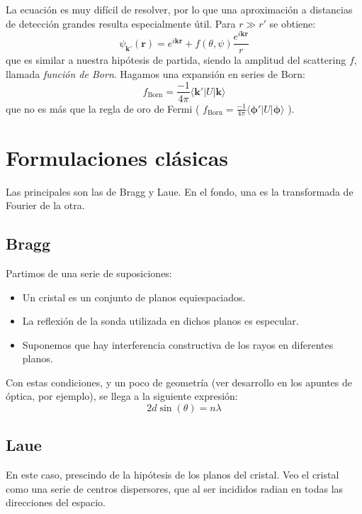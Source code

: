 La ecuación es muy difícil de resolver, por lo que una aproximación a distancias
de detección grandes resulta especialmente útil. Para $r \gg r'$ se obtiene:
\begin{equation}
  \psi _{\mathbf{k'}} (\mathbf{r}) = e ^{i\mathbf{k}\mathbf{r}} + f(\theta,\psi) \frac{e ^{i\mathbf{k}\mathbf{r}}}{r}
\end{equation}
que es similar a nuestra hipótesis de partida, siendo la amplitud del
scattering $f$, llamada \emph{función de Born}. Hagamos una expansión en series
de Born:
\begin{equation}
\label{eq:borneq}
  f _{\text{Born}} = \frac{-1}{4\pi} \langle \mathbf{k}' \vert U \vert \mathbf{k} \rangle
\end{equation}
que no es más que la regla de oro de Fermi ( $f _{\text{Born}} = \frac{-1}{4\pi}
\langle \boldsymbol{\phi}' \vert U \vert \boldsymbol{\phi} \rangle$ ).

\section{Formulaciones clásicas}
Las principales son las de Bragg y Laue. En el fondo, una es la transformada de
Fourier de la otra.

\subsection{Bragg}
Partimos de una serie de suposiciones:
\begin{itemize}
\item Un cristal es un conjunto de planos equiespaciados.
\item La reflexión de la sonda utilizada en dichos planos es especular.
\item Suponemos que hay interferencia constructiva de los rayos en diferentes
  planos.
\end{itemize}
Con estas condiciones, y un poco de geometría (ver desarrollo en los apuntes de
óptica, por ejemplo), se llega a la siguiente expresión:
\begin{equation}
  \boxed{ 2d\sin(\theta) = n\lambda
 }\end{equation}

\subsection{Laue}
En este caso, prescindo de la hipótesis de los planos del cristal. Veo el
cristal como una serie de centros dispersores, que al ser incididos radian en
todas las direcciones del espacio.

